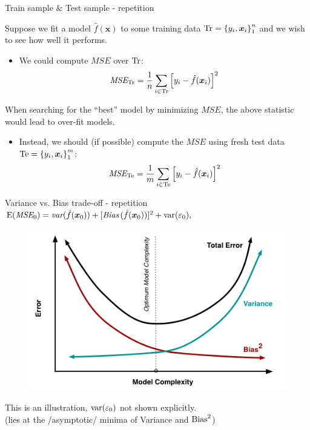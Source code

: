 \documentclass{beamer}
\begin{document}
\begin{frame}{Train sample \& Test sample - repetition}

Suppose we fit a model $\hat{f}(\bm{x})$ to some training data $\textnormal{Tr}=\left\lbrace y_i, \bm{x}_i \right\rbrace _1 ^n$ and we wish to see how well it performs.

\begin{itemize}
\item We could compute $\textit{MSE}$ over $\textnormal{Tr}$:
$$ \textit{MSE}_{\textnormal{Tr}} = \frac{1}{n}
   \sum_{i \in \textnormal{Tr}}
   \left[y_i - \hat{f}(\bm{x}_i) \right]^2 $$
\end{itemize}

When searching for the ``best'' model by minimizing $ \textit{MSE}$, the above statistic would lead to over-fit models.
\vspace{0.3cm}
\begin{itemize}
\item Instead, we should (if possible) compute the $ \textit{MSE}$ using fresh test
data $\textnormal{Te}=\left\lbrace y_i, \bm{x}_i \right\rbrace _1 ^m$:
$$ \textit{MSE}_{\textnormal{Te}} = \frac{1}{m}
    \sum_{i \in \textnormal{Te}}
   \left[y_i - \hat{f}(\bm{x}_i) \right]^2 $$
\end{itemize}
\end{frame}
\begin{frame}{Variance vs. Bias trade-off - repetition}
$\textnormal{E}(\textit{MSE}_0)
   = \textit{var}(\hat{f}(\bm{x}_0))
   + [\textit{Bias\,}(\hat{f}(\bm{x}_0))]^2
   + \textnormal{var}(\varepsilon_0),$\\
\begin{figure}
\includegraphics[angle=0,scale=0.35]{IMG/biasvariance.png}
\end{figure}
\small{This is an illustration, $\textnormal{var}(\varepsilon_0)$ not shown explicitly. \\(lies at the /asymptotic/ minima of Variance and $\textnormal{Bias}^2$)}
\end{frame}
\end{document}
